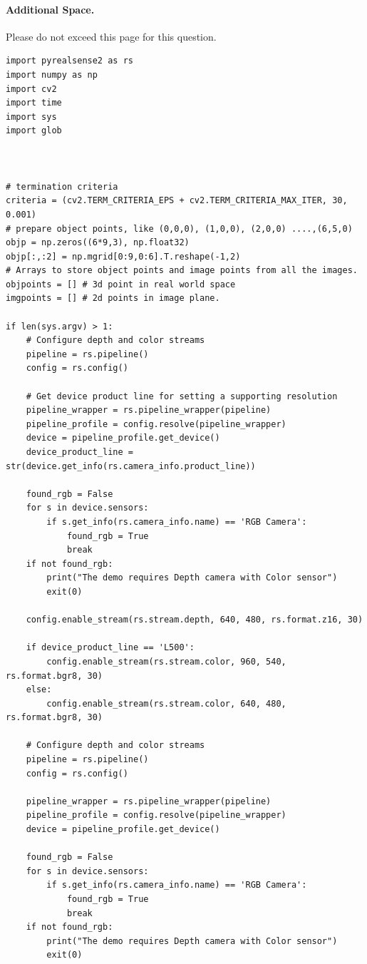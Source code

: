 \paragraph{Additional Space.}
Please do not exceed this page for this question.
\begin{verbatim}
import pyrealsense2 as rs
import numpy as np
import cv2
import time
import sys
import glob


    
# termination criteria
criteria = (cv2.TERM_CRITERIA_EPS + cv2.TERM_CRITERIA_MAX_ITER, 30, 0.001)
# prepare object points, like (0,0,0), (1,0,0), (2,0,0) ....,(6,5,0)
objp = np.zeros((6*9,3), np.float32)
objp[:,:2] = np.mgrid[0:9,0:6].T.reshape(-1,2)
# Arrays to store object points and image points from all the images.
objpoints = [] # 3d point in real world space
imgpoints = [] # 2d points in image plane.

if len(sys.argv) > 1:
    # Configure depth and color streams
    pipeline = rs.pipeline()
    config = rs.config()

    # Get device product line for setting a supporting resolution
    pipeline_wrapper = rs.pipeline_wrapper(pipeline)
    pipeline_profile = config.resolve(pipeline_wrapper)
    device = pipeline_profile.get_device()
    device_product_line = str(device.get_info(rs.camera_info.product_line))

    found_rgb = False
    for s in device.sensors:
        if s.get_info(rs.camera_info.name) == 'RGB Camera':
            found_rgb = True
            break
    if not found_rgb:
        print("The demo requires Depth camera with Color sensor")
        exit(0)

    config.enable_stream(rs.stream.depth, 640, 480, rs.format.z16, 30)

    if device_product_line == 'L500':
        config.enable_stream(rs.stream.color, 960, 540, rs.format.bgr8, 30)
    else:
        config.enable_stream(rs.stream.color, 640, 480, rs.format.bgr8, 30)
        
    # Configure depth and color streams
    pipeline = rs.pipeline()
    config = rs.config()

    pipeline_wrapper = rs.pipeline_wrapper(pipeline)
    pipeline_profile = config.resolve(pipeline_wrapper)
    device = pipeline_profile.get_device()

    found_rgb = False
    for s in device.sensors:
        if s.get_info(rs.camera_info.name) == 'RGB Camera':
            found_rgb = True
            break
    if not found_rgb:
        print("The demo requires Depth camera with Color sensor")
        exit(0)


\end{verbatim}
